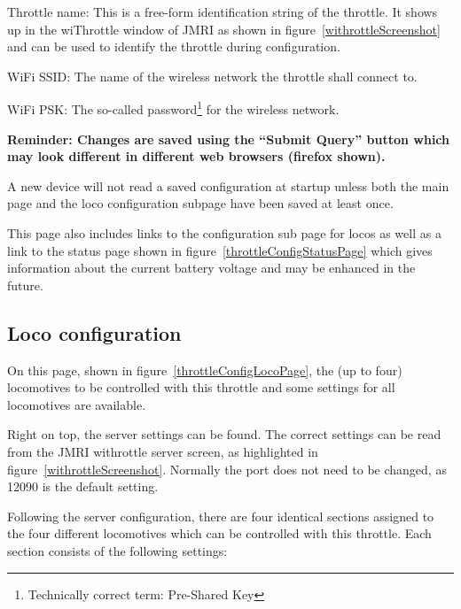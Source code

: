 \documentclass[11pt,a4paper]{scrartcl}
\begin{document}
\begin{description}
\item{Throttle name:} This is a free-form identification string of the throttle. It shows up in the wiThrottle window of JMRI as shown in figure~\ref{withrottleScreenshot} and can be used to identify the throttle during configuration.
\item{WiFi SSID:} The name of the wireless network the throttle shall connect to.
\item{WiFi PSK:} The so-called password\footnote{Technically correct term: Pre-Shared Key} for the wireless network.  
\end{description}

\textbf{Reminder: Changes are saved using the ``Submit Query'' button which may look different in different web browsers (firefox shown).}

A new device will not read a saved configuration at startup unless both the main page and the loco configuration subpage have been saved at least once.

This page also includes links to the configuration sub page for locos as well as a link to the status page shown in figure~\ref{throttleConfigStatusPage} which gives information about the current battery voltage and may be enhanced in the future.

\subsection{Loco configuration} \label{throttle_LocoConf}

On this page, shown in figure~\ref{throttleConfigLocoPage}, the (up to four) locomotives to be controlled with this throttle and some settings for all locomotives are available.

Right on top, the server settings can be found. The correct settings can be read from the JMRI withrottle server screen, as highlighted in figure~\ref{withrottleScreenshot}. Normally the port does not need to be changed, as 12090 is the default setting.

Following the server configuration, there are four identical sections assigned to the four different locomotives which can be controlled with this throttle. Each section consists of the following settings:
\end{document}
